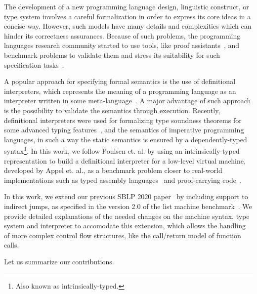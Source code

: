 \documentclass[review]{elsarticle}
\theoremstyle{definition}
\begin{document}
The development of a new programming language design, linguistic construct,
or type system involves a careful formalization in order to express
its core ideas in a concise way. However, such models have many details
and complexities which can hinder its correctness assurances.
Because of such problems, the programming languages research community
started to use tools, like proof assistants~\cite{Stump16,Chlipala13},
and benchmark problems to validate them and stress its suitability for
such specification tasks~\cite{Aydemir05,Pientka18,Appel07}.

A popular approach for specifying formal semantics is the
use of definitional interpreters, which represents the meaning of a
programming language as an interpreter written in some
meta-language~\cite{Reynolds72}. A major advantage of such approach
is the possibility to validate the semantics through execution.
Recently, definitional interpreters were used for formalizing type
soundness theorems for some advanced typing features~\cite{Amin17},
and the semantics of imperative programming languages, in such a way the static
semantics is ensured by a dependently-typed
syntax\footnote{Also known as intrinsically-typed.}\cite{Poulsen18}.
In this work, we follow Poulsen et. al. by using an intrinsically-typed
representation to build a definitional interpreter for a low-level virtual
machine, developed by Appel et. al., as a benchmark problem closer to
real-world implementations such as typed assembly languages~\cite{CraryM99} and
proof-carrying code~\cite{Necula97}.

In this work, we extend our previous SBLP 2020 paper~\cite{Feitosa2020} by including support to
indirect jumps, as specified in the version 2.0 of the list
machine benchmark~\cite{AppelDL12}. We provide detailed explanations of the needed
changes on the machine syntax, type system and interpreter to accomodate this extension, which
allows the handling of more complex control flow structures, like the call/return model of function calls.

Let us summarize our contributions. %
\end{document}
